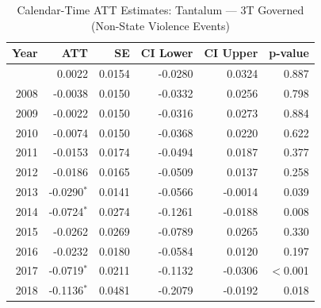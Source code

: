 \begin{longtable}{rrrrrr}
\caption{Calendar-Time ATT Estimates: Tantalum --- 3T Governed (Non-State Violence Events)} \label{tab:cal_tantalum} \\
\toprule
\textbf{Year} & \textbf{ATT} & \textbf{SE} & \textbf{CI Lower} & \textbf{CI Upper} & \textbf{p-value} \\
\midrule
\endfirsthead
\bottomrule
\endlastfoot
2007 & 0.0022 & 0.0154 & -0.0280 & 0.0324 & 0.887 \\
2008 & -0.0038 & 0.0150 & -0.0332 & 0.0256 & 0.798 \\
2009 & -0.0022 & 0.0150 & -0.0316 & 0.0273 & 0.884 \\
2010 & -0.0074 & 0.0150 & -0.0368 & 0.0220 & 0.622 \\
2011 & -0.0153 & 0.0174 & -0.0494 & 0.0187 & 0.377 \\
2012 & -0.0186 & 0.0165 & -0.0509 & 0.0137 & 0.258 \\
2013 & -0.0290$^{*}$ & 0.0141 & -0.0566 & -0.0014 & 0.039 \\
2014 & -0.0724$^{*}$ & 0.0274 & -0.1261 & -0.0188 & 0.008 \\
2015 & -0.0262 & 0.0269 & -0.0789 & 0.0265 & 0.330 \\
2016 & -0.0232 & 0.0180 & -0.0584 & 0.0120 & 0.197 \\
2017 & -0.0719$^{*}$ & 0.0211 & -0.1132 & -0.0306 & $<$0.001 \\
2018 & -0.1136$^{*}$ & 0.0481 & -0.2079 & -0.0192 & 0.018 \\
\end{longtable}
